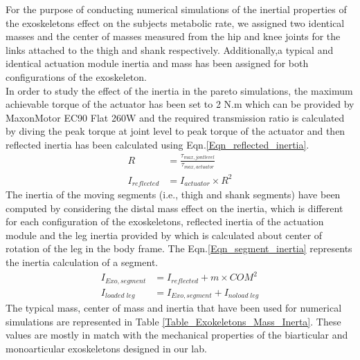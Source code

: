 \documentclass[10pt,letterpaper]{article}
\begin{document}
For the purpose of conducting numerical simulations of the inertial properties of the exoskeletons effect on the subjects metabolic rate, we assigned two identical masses and the center of masses measured from the hip and knee joints for the links attached to the thigh and shank respectively. Additionally,a typical and identical actuation module inertia and mass has been assigned for both configurations of the exoskeleton.\\
In order to study the effect of the inertia in the pareto simulations, the maximum achievable torque of the actuator has been set to 2 N.m which can be provided by MaxonMotor EC90 Flat 260W and the required transmission ratio is calculated by diving the peak torque at joint level to peak torque of the actuator and then reflected inertia has been calculated using Eqn.\ref{Eqn_reflected_inertia}.\\
\begin{equation}\label{Eqn_reflected_inertia}
	\begin{aligned}
	R &= \frac{\tau_{max,jont level}}{\tau_{max,actuator}}\\
	I_{reflected} &= I_{actuator}\times R^{2}
	\end{aligned}
\end{equation}
The inertia of the moving segments (i.e., thigh and shank segments) have been computed by considering the distal mass effect on the inertia, which is different for each configuration of the exoskeletons, reflected inertia of the actuation module and the leg inertia provided by \cite{133} which is calculated about center of rotation of the leg in the body frame. The Eqn.\ref{Eqn_segment_inertia} represents the inertia calculation of a segment.
\begin{equation}\label{Eqn_segment_inertia}
\begin{aligned}
I_{Exo,segment} &= I_{reflected} + m\times COM^{2}\\
I_{loaded\;leg} &= I_{Exo,segment} + I_{noload\;leg}
\end{aligned}
\end{equation}
The typical mass, center of mass and inertia that have been used for numerical simulations are represented in Table \ref{Table_Exokeletons_Mass_Inerta}. These values are mostly in match with the mechanical properties of the biarticular and monoarticular exoskeletons designed in our lab.\\
\end{document}
